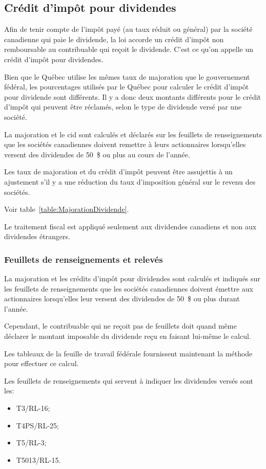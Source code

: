 \subsection{Crédit d'impôt pour dividendes}
Afin de tenir compte de l'impôt payé (au taux réduit ou général) par la société canadienne qui paie le dividende, la loi accorde un crédit d'impôt non remboursable au contribuable qui reçoit le dividende. C'est ce qu'on appelle un crédit d'impôt pour dividendes. 

Bien que le Québec utilise les mêmes taux de majoration que le gouvernement fédéral, les pourcentages utilisés par le Québec pour calculer le crédit d'impôt pour dividende sont différents. Il y a donc deux montants différents pour le crédit d'impôt qui peuvent être réclamés, selon le type de dividende versé par une société.

La majoration et le \acrfull{cid} sont calculés et déclarés sur les feuillets de renseignements que les sociétés canadiennes doivent remettre à leurs actionnaires lorsqu'elles versent des dividendes de 50~\$ ou plus au cours de l'année. 

Les taux de majoration et du crédit d'impôt peuvent être assujettis à un ajustement s'il y a une réduction du taux d'imposition général sur le revenu des sociétés.

Voir table~\ref{table:MajorationDividende}.

\begin{note}
	Le traitement fiscal est appliqué seulement aux dividendes canadiens et non aux dividendes étrangers.
\end{note}

\subsubsection{Feuillets de renseignements et relevés}
La majoration et les crédits d'impôt pour dividendes sont calculés et indiqués sur les feuillets de renseignements que les sociétés canadiennes doivent émettre aux actionnaires lorsqu'elles leur versent des dividendes de 50~\$ ou plus durant l'année. 

Cependant, le contribuable qui ne reçoit pas de feuillets doit quand même déclarer le montant imposable du dividende reçu en faisant lui-même le calcul.

Les tableaux de la feuille de travail fédérale fournissent maintenant la méthode pour effectuer ce calcul.

Les feuillets de renseignements qui servent à indiquer les dividendes versés sont les: 
\begin{itemize}
	\item T3/RL-16;
	\item T4PS/RL-25;
	\item T5/RL-3;
	\item T5013/RL-15. 
\end{itemize}


